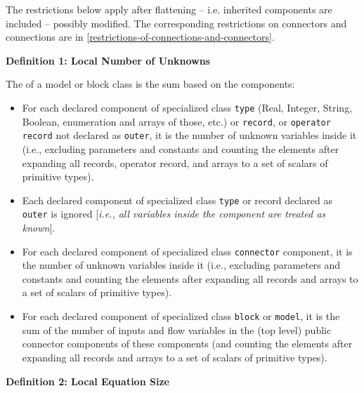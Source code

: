 The restrictions below apply after flattening -- i.e. inherited
components are included -- possibly modified. The corresponding
restrictions on connectors and connections are in \autoref{restrictions-of-connections-and-connectors}.

\textbf{Definition 1: Local Number of Unknowns}

The  of a model or block class is the sum based
on the components:
\begin{itemize}
\item
  For each declared component of specialized class \lstinline!type! (Real, Integer,
  String, Boolean, enumeration and arrays of those, etc.) or \lstinline!record!, or
  \lstinline!operator record! not declared as \lstinline!outer!, it is the number of unknown
  variables inside it (i.e., excluding parameters and constants and
  counting the elements after expanding all records, operator record,
  and arrays to a set of scalars of primitive types).
\item
  Each declared component of specialized class \lstinline!type! or record declared
  as \lstinline!outer! is ignored {[}\emph{i.e., all variables inside the component
  are treated as known}{]}.
\item
  For each declared component of specialized class \lstinline!connector! component,
  it is the number of unknown variables inside it (i.e., excluding
  parameters and constants and counting the elements after expanding all
  records and arrays to a set of scalars of primitive types).
\item
  For each declared component of specialized class \lstinline!block! or \lstinline!model!, it is
  the sum of the number of inputs and flow variables in the (top
  level) public connector components of these components (and counting
  the elements after expanding all records and arrays to a set of
  scalars of primitive types).
\end{itemize}

\textbf{Definition 2: Local Equation Size}

